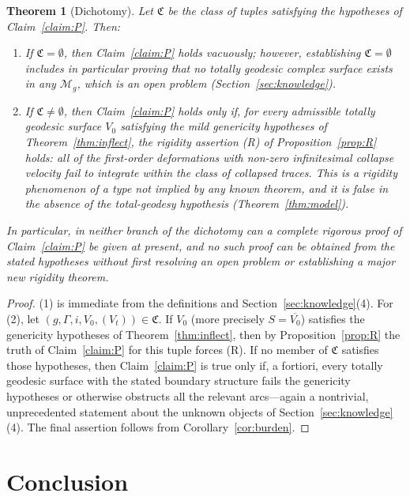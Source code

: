 \documentclass[11pt]{amsart}
\newcommand{\M}{\mathcal{M}}
\theoremstyle{plain}
\newtheorem{theorem}{Theorem}[section]
\theoremstyle{definition}
\theoremstyle{remark}
\begin{document}
\begin{theorem}[Dichotomy]\label{thm:dichotomy}
Let $\mathfrak C$ be the class of tuples satisfying the hypotheses of
Claim~\ref{claim:P}. Then:
\begin{enumerate}
\item If $\mathfrak C=\emptyset$, then Claim~\ref{claim:P} holds vacuously; however,
establishing $\mathfrak C=\emptyset$ includes in particular proving that no totally
geodesic complex surface exists in any $\M_g$, which is an open problem
(Section~\textup{\ref{sec:knowledge}}).
\item If $\mathfrak C\ne\emptyset$, then Claim~\ref{claim:P} holds only if, for every
admissible totally geodesic surface $V_0$ satisfying the mild genericity hypotheses of
Theorem~\textup{\ref{thm:inflect}}, the rigidity assertion \textup{(R)} of
Proposition~\textup{\ref{prop:R}} holds: all of the first-order deformations with
non-zero infinitesimal collapse velocity fail to integrate within the class of
collapsed traces. This is a rigidity phenomenon of a type not implied by any known
theorem, and it is false in the absence of the total-geodesy hypothesis
(Theorem~\textup{\ref{thm:model}}).
\end{enumerate}
In particular, in neither branch of the dichotomy can a complete rigorous proof of
Claim~\ref{claim:P} be given at present, and no such proof can be obtained from the
stated hypotheses without first resolving an open problem or establishing a major new
rigidity theorem.
\end{theorem}

\begin{proof}
(1) is immediate from the definitions and Section~\ref{sec:knowledge}(4). For (2),
let $(g,\Gamma,i,V_0,(V_t))\in\mathfrak C$. If $V_0$ (more precisely
$S=\overline{V_0}$) satisfies the genericity hypotheses of
Theorem~\ref{thm:inflect}, then by Proposition~\ref{prop:R} the truth of
Claim~\ref{claim:P} for this tuple forces (R). If no member of $\mathfrak C$ satisfies
those hypotheses, then Claim~\ref{claim:P} is true only if, a fortiori, every totally
geodesic surface with the stated boundary structure fails the genericity hypotheses
or otherwise obstructs all the relevant arcs---again a nontrivial, unprecedented
statement about the unknown objects of Section~\ref{sec:knowledge}(4). The final
assertion follows from Corollary~\ref{cor:burden}.
\end{proof}

\section{Conclusion}\label{sec:conc}
\end{document}
